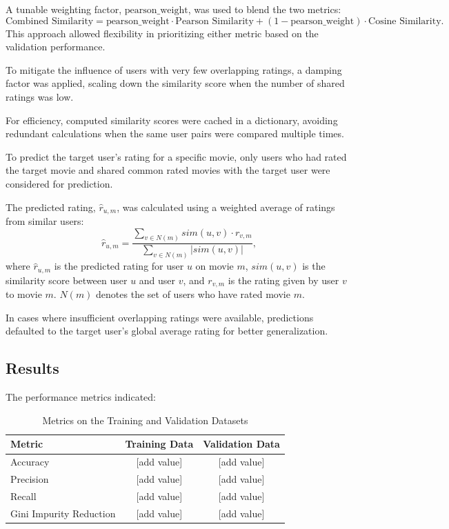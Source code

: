 \documentclass[a3paper,12pt]{article}
\begin{document}
A tunable weighting factor, \( \text{pearson\_weight} \), was used to blend the two metrics:
\begin{equation}
    \text{Combined Similarity} = \text{pearson\_weight} \cdot \text{Pearson Similarity} + (1 - \text{pearson\_weight}) \cdot \text{Cosine Similarity}.
\end{equation}
This approach allowed flexibility in prioritizing either metric based on the validation performance.

To mitigate the influence of users with very few overlapping ratings, a damping factor was applied, scaling down the
similarity score when the number of shared ratings was low.

For efficiency, computed similarity scores were cached in a dictionary, avoiding redundant calculations when the same user
pairs were compared multiple times.

To predict the target user's rating for a specific movie, only users who had rated the target movie and shared common
rated movies with the target user were considered for prediction.

The predicted rating, \( \hat{r}_{u,m} \), was calculated using a weighted average of ratings from similar users:
\begin{equation}
    \hat{r}_{u,m} = \frac{\sum_{v \in N(m)} sim(u,v) \cdot r_{v,m}}{\sum_{v \in N(m)} |sim(u,v)|},
\end{equation}
where \( \hat{r}_{u,m} \) is the predicted rating for user \( u \) on movie \( m \), \( sim(u,v) \) is the similarity score between user \( u \) and user \( v \), and \( r_{v,m} \) is the rating given by user \( v \) to movie \( m \). \( N(m) \) denotes the set of users who have rated movie \( m \).

In cases where insufficient overlapping ratings were available, predictions defaulted to the target user's global average rating for better generalization.

\subsection{Results}
The performance metrics indicated:

\begin{table}[h]
    \centering
    \begin{tabular}{|l|c|c|}
        \hline
        \textbf{Metric} & \textbf{Training Data} & \textbf{Validation Data} \\ \hline
        Accuracy        & [add value]         & [add value]           \\ \hline
        Precision       & [add value]         & [add value]           \\ \hline
        Recall          & [add value]         & [add value]           \\ \hline
        Gini Impurity Reduction & [add value]   & [add value]           \\ \hline
    \end{tabular}
    \caption{Metrics on the Training and Validation Datasets}
    \label{tab:performance_metrics}
\end{table}
\end{document}
